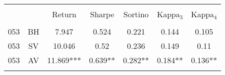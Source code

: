 \begin{tabular}{@{\extracolsep{5pt}} Hcccccc} 
\\[-1.8ex]\hline 
\hline \\[-1.8ex] 
&  & Return & Sharpe & Sortino & Kappa$_{3}$ & Kappa$_{4}$ \\ 
\hline \\[-1.8ex] 
053 & BH & 7.947 & 0.524 & 0.221 & 0.144 & 0.105 \\ 
053 & SV & 10.046 & 0.52 & 0.236 & 0.149 & 0.11 \\ 
053 & AV & 11.869*** & 0.639** & 0.282** & 0.184** & 0.136** \\ 
\hline \\[-1.8ex] 
\end{tabular} 